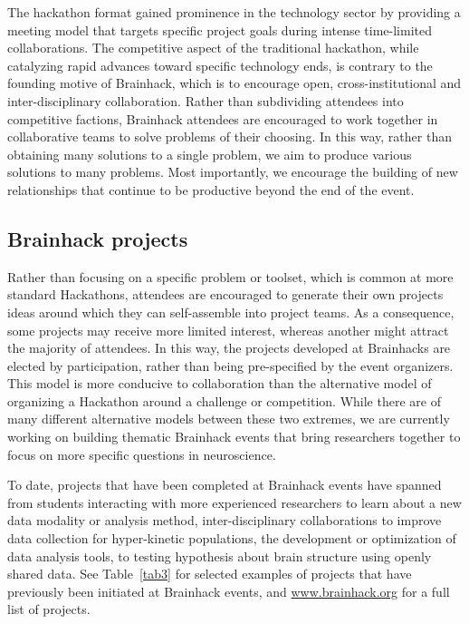 \documentclass[11pt]{bmc_article_s50}
\begin{document}
The hackathon format gained prominence in the technology sector by providing a meeting model that targets specific project goals during intense time-limited collaborations. The competitive aspect of the traditional hackathon, while catalyzing rapid advances toward specific technology ends, is contrary to the founding motive of Brainhack, which is to encourage open, cross-institutional and inter-disciplinary collaboration. Rather than subdividing attendees into competitive factions, Brainhack attendees are encouraged to work together in collaborative teams to solve problems of their choosing. In this way, rather than obtaining many solutions to a single problem, we aim to produce various solutions to many problems. Most importantly, we encourage the building of new relationships that continue to be productive beyond the end of the event.

\subsection{Brainhack projects}

Rather than focusing on a specific problem or toolset, which is common at more standard Hackathons, attendees are encouraged to generate their own projects ideas around which they can self-assemble into project teams. As a consequence, some projects may receive more limited interest, whereas another might attract the majority of attendees. In this way, the projects developed at Brainhacks are elected by participation, rather than being pre-specified by the event organizers. This model is more conducive to collaboration than the alternative model of organizing a Hackathon around a challenge or competition. While there are of many different alternative models between these two extremes, we are currently working on building thematic Brainhack events that bring researchers together to focus on more specific questions in neuroscience.

To date, projects that have been completed at Brainhack events have spanned from students interacting with more experienced researchers to learn about a new data modality or analysis method, inter-disciplinary collaborations to improve data collection for hyper-kinetic populations, the development or optimization of data analysis tools, to testing hypothesis about brain structure using openly shared data. See Table~\ref{tab3} for selected examples of projects that have previously been initiated at Brainhack events, and \href{http://www.brainhack.org}{www.brainhack.org} for a full list of projects.
\end{document}
